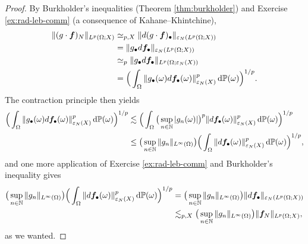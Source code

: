 \begin{proof}
  By Burkholder's inequalities (Theorem \ref{thm:burkholder}) and Exercise \ref{ex:rad-leb-comm} (a consequence of Kahane--Khintchine), 
  \begin{equation*}
    \begin{aligned}
      \|(g \cdot \bm{f})_{N}\|_{L^p(\Omega;X)}
      &\simeq_{p,X} \|d(g \cdot \bm{f})_{\bullet}\|_{\varepsilon_{N}(L^p(\Omega;X))} \\
      &= \|g_{\bullet} d\bm{f}_{\bullet}\|_{\varepsilon_{N}(L^p(\Omega;X))} \\
      &\simeq_{p} \|g_{\bullet} d\bm{f}_{\bullet}\|_{L^p(\Omega;\varepsilon_{N}(X))} \\
      &= \Big( \int_{\Omega} \|g_{\bullet}(\omega) d\bm{f}_{\bullet}(\omega)\|_{\varepsilon_{N}(X)}^{p} \, \mathrm{d}\mathbb{P}(\omega) \Big)^{1/p}.
    \end{aligned}
  \end{equation*}
  The contraction principle then yields
  \begin{equation*}
    \begin{aligned}
    \Big( \int_{\Omega} \|g_{\bullet}(\omega) d\bm{f}_{\bullet}(\omega)\|_{\varepsilon_{N}(X)}^{p} \, \mathrm{d}\mathbb{P}(\omega) \Big)^{1/p}
    &\lesssim \Big( \int_{\Omega} \big( \sup_{n \in \mathbb{N}} |g_{n}(\omega)| \big)^{p} \|d\bm{f}_{\bullet}(\omega)\|_{\varepsilon_{N}(X)}^{p} \, \mathrm{d}\mathbb{P}(\omega) \Big)^{1/p} \\
    &\leq \big( \sup_{n \in \mathbb{N}} \|g_{n}\|_{L^\infty(\Omega)} \big)  \Big( \int_{\Omega} \|d\bm{f}_{\bullet}(\omega)\|_{\varepsilon_{N}(X)}^{p} \, \mathrm{d}\mathbb{P}(\omega) \Big)^{1/p},
  \end{aligned}
\end{equation*}
and one more application of Exercise \ref{ex:rad-leb-comm} and Burkholder's inequality gives
\begin{equation*}
  \begin{aligned}
    \big( \sup_{n \in \mathbb{N}} \|g_{n}\|_{L^\infty(\Omega)} \big)  \Big( \int_{\Omega} \|d\bm{f}_{\bullet}(\omega)\|_{\varepsilon_{N}(X)}^{p} \, \mathrm{d}\mathbb{P}(\omega) \Big)^{1/p}
    &= \big( \sup_{n \in \mathbb{N}} \|g_{n}\|_{L^\infty(\Omega)} \big) \|d\bm{f}_{\bullet}\|_{\varepsilon_{N}(L^p(\Omega;X))} \\
    &\lesssim_{p,X} \big( \sup_{n \in \mathbb{N}} \|g_{n}\|_{L^\infty(\Omega)} \big) \|\bm{f}_{N}\|_{L^p(\Omega;X)},
  \end{aligned}
\end{equation*}
as we wanted.
\end{proof}


